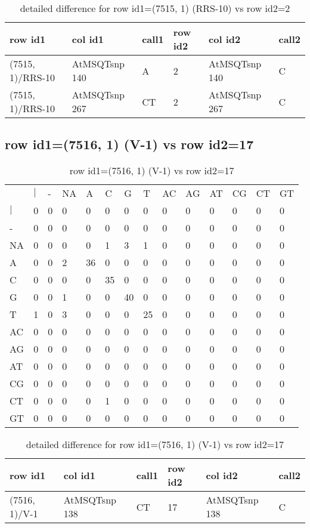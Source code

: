 \begin{center}
\begin{longtable}{|l|l|l|l|l|l|}
\caption{detailed difference for row id1=(7515, 1) (RRS-10) vs row id2=2} \label{table_dm319}\\
\hline
row id1&col id1&call1&row id2&col id2&call2\\
\hline
(7515, 1)/RRS-10&AtMSQTsnp 140&A&2&AtMSQTsnp 140&C\\
(7515, 1)/RRS-10&AtMSQTsnp 267&CT&2&AtMSQTsnp 267&C\\
\hline
\end{longtable}
\end{center}

\subsection{row id1=(7516, 1) (V-1) vs row id2=17}
\begin{center}
\begin{longtable}{|l|l|l|l|l|l|l|l|l|l|l|l|l|l|}
\caption{row id1=(7516, 1) (V-1) vs row id2=17} \label{table_dm320}\\
\hline
\\
\hline
&$|$&-&NA&A&C&G&T&AC&AG&AT&CG&CT&GT\\
$|$&0&0&0&0&0&0&0&0&0&0&0&0&0\\
-&0&0&0&0&0&0&0&0&0&0&0&0&0\\
NA&0&0&0&0&1&3&1&0&0&0&0&0&0\\
A&0&0&2&36&0&0&0&0&0&0&0&0&0\\
C&0&0&0&0&35&0&0&0&0&0&0&0&0\\
G&0&0&1&0&0&40&0&0&0&0&0&0&0\\
T&1&0&3&0&0&0&25&0&0&0&0&0&0\\
AC&0&0&0&0&0&0&0&0&0&0&0&0&0\\
AG&0&0&0&0&0&0&0&0&0&0&0&0&0\\
AT&0&0&0&0&0&0&0&0&0&0&0&0&0\\
CG&0&0&0&0&0&0&0&0&0&0&0&0&0\\
CT&0&0&0&0&1&0&0&0&0&0&0&0&0\\
GT&0&0&0&0&0&0&0&0&0&0&0&0&0\\
\hline
\end{longtable}
\end{center}

\begin{center}
\begin{longtable}{|l|l|l|l|l|l|}
\caption{detailed difference for row id1=(7516, 1) (V-1) vs row id2=17} \label{table_dm321}\\
\hline
row id1&col id1&call1&row id2&col id2&call2\\
\hline
(7516, 1)/V-1&AtMSQTsnp 138&CT&17&AtMSQTsnp 138&C\\
\hline
\end{longtable}
\end{center}

